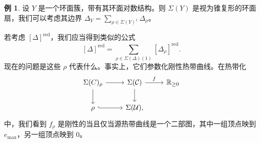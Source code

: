 \documentclass{amsart}
\theoremstyle{definition}
\newtheorem{exm}[thm]{例}
\theoremstyle{remark}
\theoremstyle{plain}
\theoremstyle{definition}
\theoremstyle{remark}
\newcommand{\R}{\mathbb{R}}
\newcommand{\mc}[1]{\mathcal{#1}}
\newcommand{\on}[1]{\operatorname{#1}}
\newcommand{\1}{\mathbf{1}}
\newcommand{\2}{\mathbf{2}}
\newcommand{\3}{\mathbf{3}}
\begin{document}
\begin{exm}
    设 \(Y\) 是一个环面簇，带有其环面对数结构。则 \(\Sigma(Y)\) 是视为锥复形的环面扇，我们可以考虑其边界 \(\Delta_Y = \sum_{\rho \in \Sigma(Y)^1} \Delta_{\rho}\)。
\end{exm}

若考虑 \([\Delta]^{\on{red}}\)，我们应当得到类似的公式
\[ [\Delta]^{\on{red}} = \sum_{\rho \in \Sigma(\Delta)(1)} [\Delta_{\rho}]^{\on{red}}. \]
现在的问题是这些 \(\rho\) 代表什么。事实上，它们参数化刚性热带曲线。在热带化
\begin{equation*}
\begin{tikzcd}
    \Sigma(C)_{\rho} \ar{d} \ar{r} & \Sigma(\mc{C}) \ar{r}{f} \ar{d} & \R_{\geq 0} \\
    \rho \ar[hookrightarrow]{r} & \Sigma(\mc{U}),
\end{tikzcd}
\end{equation*}
中，我们看到 \(f_{\rho}\) 是刚性的当且仅当源热带曲线是一个二部图，其中一组顶点映到 \(e_{\max}\)，另一组顶点映到 \(0\)。
\end{document}
